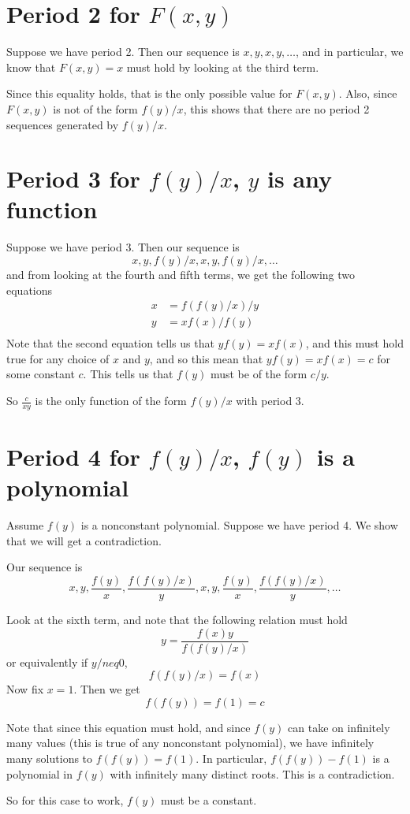 \documentclass[12pt]{article}
\begin{document}
\maketitle


\section{Period 2 for $F(x,y)$}

Suppose we have period 2. Then our sequence is $x,y,x,y,\dots$, and in particular, we know that $F(x,y) = x$ must hold by looking at the third term.

Since this equality holds, that is the only possible value for $F(x,y)$. Also, since $F(x,y)$ is not of the form $f(y)/x$, this shows that there are no period 2 sequences generated by $f(y)/x$.

\section{Period 3 for $f(y)/x$, $y$ is any function}

Suppose we have period 3. Then our sequence is
\[ x,y,f(y)/x,x,y,f(y)/x,\dots\]
and from looking at the fourth and fifth terms, we get the following two equations
\begin{align*}
x &= f(f(y)/x)/y\\
y &= xf(x)/f(y)\\
\end{align*}
Note that the second equation tells us that $yf(y) = xf(x)$, and this must hold true for any choice of $x$ and $y$, and so this mean that $yf(y) = xf(x) = c$ for some constant $c$. This tells us that $f(y)$ must be of the form $c/y$.

So $\frac{c}{xy}$ is the only function of the form $f(y)/x$ with period 3.
\section{Period 4 for $f(y)/x$, $f(y)$ is a polynomial}

Assume $f(y)$ is a nonconstant polynomial. Suppose we have period 4. We show that we will get a contradiction.

Our sequence is
\[ x,y,\frac{f(y)}{x},\frac{f(f(y)/x)}{y},x,y,\frac{f(y)}{x},\frac{f(f(y)/x)}{y},\dots\]

Look at the sixth term, and note that the following relation must hold
\[ y = \frac{f(x)y}{f(f(y)/x)} \]
or equivalently if $y /neq 0$,
\[ f(f(y)/x) = f(x) \]
Now fix $x = 1$. Then we get 
\[ f(f(y)) = f(1) = c \]

Note that since this equation must hold, and since $f(y)$ can take on infinitely many values (this is true of any nonconstant polynomial), we have infinitely many solutions to $f(f(y)) = f(1)$. In particular, $f(f(y)) - f(1)$ is a polynomial in $f(y)$ with infinitely many distinct roots. This is a contradiction.

So for this case to work, $f(y)$ must be a constant.
\end{document}
